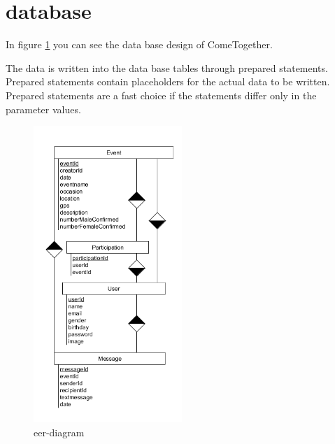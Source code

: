 \section{database}\label{database}
In figure \ref{fig:EERdiagram} you can see the data base design of ComeTogether.

The data is written into the data base tables through prepared statements. Prepared statements contain placeholders for the actual data to be written. Prepared statements are a fast choice if the statements differ only in the parameter values.

\begin{figure}[htp]
\centering
\includegraphics[width=0.5\textwidth]{Ingo/pictures/EER-diagram.png}
\caption{eer-diagram}
\label{fig:EERdiagram}
\end{figure}
